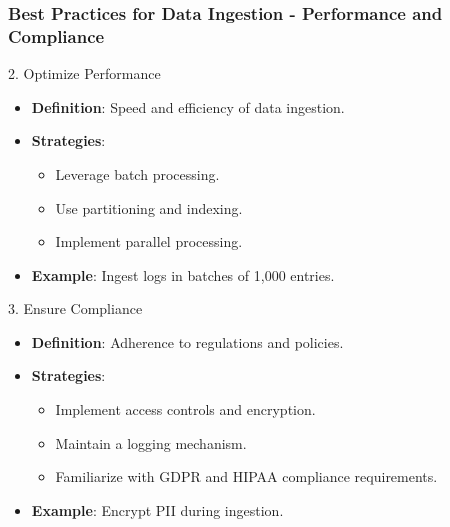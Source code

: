 \documentclass[aspectratio=169]{beamer}
\begin{document}
\begin{frame}[fragile]
    \frametitle{Best Practices for Data Ingestion - Performance and Compliance}
    \begin{block}{2. Optimize Performance}
        \begin{itemize}
            \item \textbf{Definition}: Speed and efficiency of data ingestion.
            \item \textbf{Strategies}:
            \begin{itemize}
                \item Leverage batch processing.
                \item Use partitioning and indexing.
                \item Implement parallel processing.
            \end{itemize}
            \item \textbf{Example}: Ingest logs in batches of 1,000 entries.
        \end{itemize}
    \end{block}
    
    \begin{block}{3. Ensure Compliance}
        \begin{itemize}
            \item \textbf{Definition}: Adherence to regulations and policies.
            \item \textbf{Strategies}:
            \begin{itemize}
                \item Implement access controls and encryption.
                \item Maintain a logging mechanism.
                \item Familiarize with GDPR and HIPAA compliance requirements.
            \end{itemize}
            \item \textbf{Example}: Encrypt PII during ingestion.
        \end{itemize}
    \end{block}
\end{frame}
\end{document}
